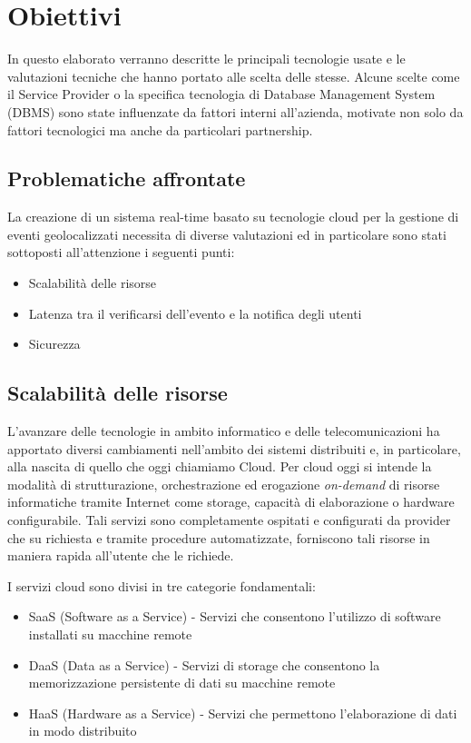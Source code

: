 \chapter{Obiettivi}
In questo elaborato verranno descritte le principali tecnologie usate e le valutazioni tecniche che hanno portato alle scelta delle stesse. Alcune scelte come il Service Provider o la specifica tecnologia di Database Management System (DBMS) sono state influenzate da fattori interni all'azienda, motivate non solo da fattori tecnologici ma anche da particolari partnership.


\section{Problematiche affrontate}
La creazione di un sistema real-time basato su tecnologie cloud per la gestione di eventi geolocalizzati necessita di diverse valutazioni ed in particolare sono stati sottoposti all'attenzione i seguenti punti:
\begin{itemize}
\item Scalabilità delle risorse
\item Latenza tra il verificarsi dell'evento e la notifica degli utenti
\item Sicurezza
\end{itemize}

\section*{Scalabilità delle risorse}
L'avanzare delle tecnologie in ambito informatico e delle telecomunicazioni ha apportato diversi cambiamenti nell'ambito dei sistemi distribuiti e, in particolare, alla nascita di quello che oggi chiamiamo Cloud.
Per cloud oggi si intende la modalità di strutturazione, orchestrazione ed erogazione {\itshape on-demand} di risorse informatiche tramite Internet come storage, capacità di elaborazione o hardware configurabile. Tali servizi sono completamente ospitati e configurati da provider che su richiesta e tramite procedure automatizzate, forniscono tali risorse in maniera rapida all'utente che le richiede.

I servizi cloud sono divisi in tre categorie fondamentali:
\begin{itemize}
\item SaaS (Software as a Service) - Servizi che consentono l'utilizzo di software installati su macchine remote
\item DaaS (Data as a Service) - Servizi di storage che consentono la memorizzazione persistente di dati su macchine remote
\item HaaS (Hardware as a Service) - Servizi che permettono l'elaborazione di dati in modo distribuito
\end{itemize}

